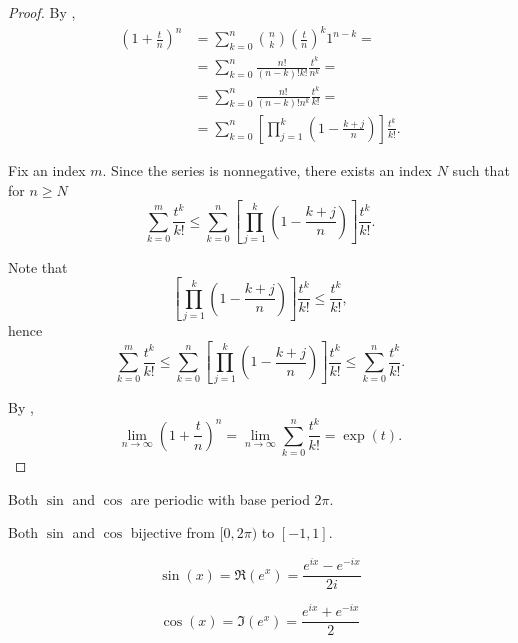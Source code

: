 \begin{proof}
  \cite[3.31]{Rudin1976} By ,
  \begin{align*}
    \left(1 + \frac t n \right)^n
    &=
    \sum_{k=0}^n \binom{n}{k} \left(\frac t n\right)^k 1^{n-k}
    = \\ &=
    \sum_{k=0}^n \frac {n!} {(n-k)! k!} \frac {t^k} {n^k}
    = \\ &=
    \sum_{k=0}^n \frac {n!} {(n-k)! n^k} \frac {t^k} {k!}
    = \\ &=
    \sum_{k=0}^n \left[ \prod_{j=1}^k \left(1 - \frac {k+j} n \right) \right] \frac {t^k} {k!}.
  \end{align*}

  Fix an index \( m \). Since the series is nonnegative, there exists an index \( N \) such that for \( n \geq N \)
  \begin{equation*}
    \sum_{k=0}^m \frac {t^k} {k!}
    \leq
    \sum_{k=0}^n \left[ \prod_{j=1}^k \left(1 - \frac {k+j} n \right) \right] \frac {t^k} {k!}.
  \end{equation*}

  Note that
  \begin{equation*}
    \left[ \prod_{j=1}^k \left(1 - \frac {k+j} n \right) \right] \frac {t^k} {k!}
    \leq
    \frac {t^k} {k!},
  \end{equation*}
  hence
  \begin{equation*}
    \sum_{k=0}^m \frac {t^k} {k!}
    \leq
    \sum_{k=0}^n \left[ \prod_{j=1}^k \left(1 - \frac {k+j} n \right) \right] \frac {t^k} {k!}
    \leq
    \sum_{k=0}^n \frac {t^k} {k!}.
  \end{equation*}

  By ,
  \begin{equation*}
    \lim_{n \to \infty} \left(1 + \frac t n \right)^n
    =
    \lim_{n \to \infty} \sum_{k=0}^n \frac {t^k} {k!}
    =
    \exp(t).
  \end{equation*}
\end{proof}

\begin{proposition}\label{thm:trigonometric_function_properties}
  \mbox{}
  \begin{thmenum}
     Both \( \sin \) and \( \cos \) are periodic with base period \( 2\pi \).

     Both \( \sin \) and \( \cos \) bijective from \( [0, 2\pi) \) to \( [-1, 1] \).

    \begin{equation*}
       \sin(x) = \Re(e^x) = \frac {e^{ix} - e^{-ix}} {2i}
    \end{equation*}

    \begin{equation*}
       \cos(x) = \Im(e^x) = \frac {e^{ix} + e^{-ix}} 2
    \end{equation*}
  \end{thmenum}
\end{proposition}

